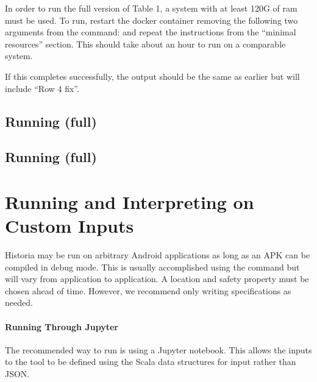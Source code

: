 \documentclass{acmart} %
\begin{document}

In order to run the full version of Table 1, a system with at least 120G of ram must be used. To run, restart the docker container removing the following two arguments from the  command:  and repeat the instructions from the ``minimal resources'' section.  This should take about an hour to run on a comparable system.

If this completes successfully, the output should be the same as earlier but will include ``Row 4 fix''.  


\subsection{Running  (full)}

\TODO{}

\subsection{Running  (full)}

\TODO{}



\section{Running and Interpreting \toolname on Custom Inputs}

Historia may be run on arbitrary Android applications as long as an APK can be compiled in debug mode.  This is usually accomplished using the command  but will vary from application to application. A location and safety property must be chosen ahead of time.  However, we recommend only writing \newls specifications as needed.

\paragraph{Running \toolname Through Jupyter}
The recommended way to run \toolname is using a Jupyter notebook.  This allows the inputs to the tool to be defined using the Scala data structures for input rather than JSON.


\end{document}

